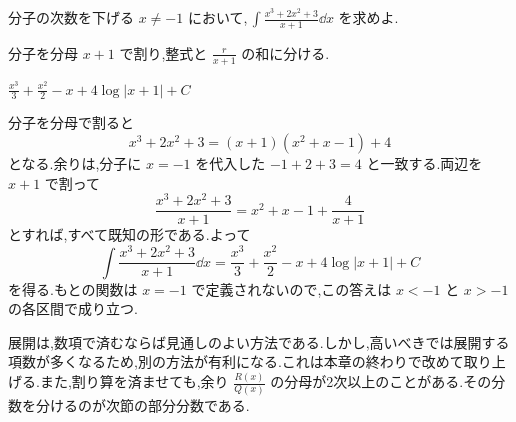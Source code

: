 \begin{example}{分子の次数を下げる}
$x\ne-1$ において,\,$\int\frac{x^3+2x^2+3}{x+1}\dd x$ を求めよ.
\end{example}

分子を分母 $x+1$ で割り,整式と $\frac{r}{x+1}$ の和に分ける.

$\frac{x^3}{3}+\frac{x^2}{2}-x+4\log|x+1|+C$

分子を分母で割ると
\[
 x^3+2x^2+3=(x+1)(x^2+x-1)+4
\]
となる.余りは,分子に $x=-1$ を代入した $-1+2+3=4$ と一致する.両辺を $x+1$ で割って
\[
 \frac{x^3+2x^2+3}{x+1}
 =x^2+x-1+\frac4{x+1}
\]
とすれば,すべて既知の形である.よって
\[
 \int\frac{x^3+2x^2+3}{x+1}\dd x
 =\frac{x^3}{3}+\frac{x^2}{2}-x+4\log|x+1|+C
\]
を得る.もとの関数は $x=-1$ で定義されないので,この答えは $x<-1$ と $x>-1$ の各区間で成り立つ.

展開は,数項で済むならば見通しのよい方法である.しかし,高いべきでは展開する項数が多くなるため,別の方法が有利になる.これは本章の終わりで改めて取り上げる.また,割り算を済ませても,余り $\frac{R(x)}{Q(x)}$ の分母が2次以上のことがある.その分数を分けるのが次節の部分分数である.
